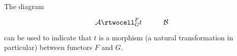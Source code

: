 \begin{frame}
	The diagram
	$$
	\xymatrix{
	\mathcal{A}
	\rtwocell^F_G{t}
	&
	\mathcal{B}
	}
	$$
	can be used to indicate that $t$ is a morphism (a natural transformation in particular) between functors $F$ and $G$.
\end{frame}
